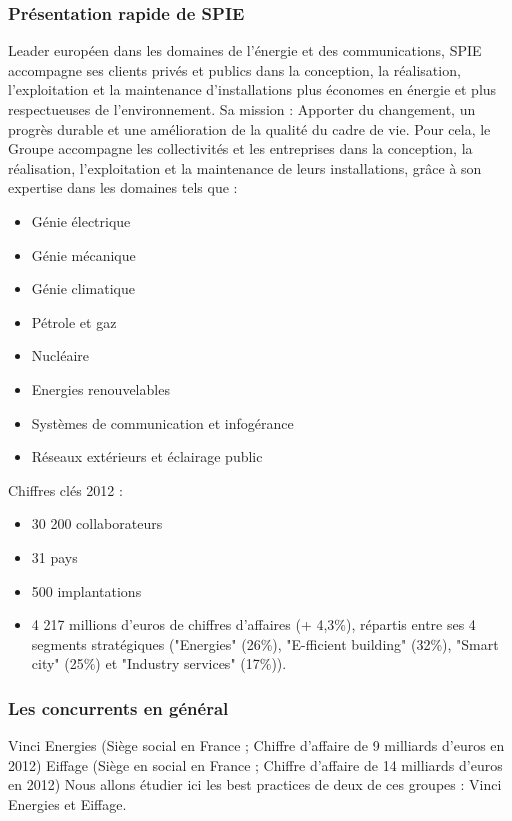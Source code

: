 \subsubsection{Présentation rapide de SPIE}
	Leader européen dans les domaines de l'énergie et des communications, SPIE accompagne ses clients privés et publics dans la conception, la réalisation, l'exploitation et la maintenance d'installations plus économes en énergie et plus respectueuses de l'environnement.
	Sa mission : Apporter du changement, un progrès durable et une amélioration de la qualité du cadre de vie.
\newpage
	Pour cela, le Groupe accompagne les collectivités et les entreprises dans la conception, la réalisation, l'exploitation et la maintenance de leurs installations, grâce à son expertise dans les domaines tels que :
\begin{itemize}
	\item Génie électrique
	\item Génie mécanique
	\item Génie climatique
	\item Pétrole et gaz
	\item Nucléaire
	\item Energies renouvelables
	\item Systèmes de communication et infogérance
	\item Réseaux extérieurs et éclairage public
\end{itemize}
\bigbreak
Chiffres clés 2012 :
\begin{itemize}
	\item 30 200 collaborateurs
	\item 31 pays
	\item 500 implantations
	\item 4 217 millions d'euros de chiffres d'affaires (+ 4,3\%), répartis entre ses 4 segments stratégiques ("Energies" (26\%), "E-fficient building" (32\%), "Smart city" (25\%) et "Industry services" (17\%)).
\end{itemize}

\subsubsection{Les concurrents en général}
Vinci Energies (Siège social en France ; Chiffre d'affaire de 9 milliards d’euros en 2012)
Eiffage (Siège en social en France ; Chiffre d'affaire de 14 milliards d’euros en 2012)
	Nous allons étudier ici les best practices de deux de ces groupes : Vinci Energies et Eiffage.

